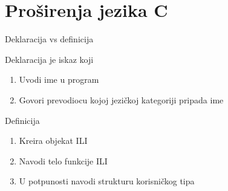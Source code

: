 \documentclass{article}
\newenvironment{xitemize}{%
    
    \itemize
    \larger
}{%
    \enditemize
}
\let\olditemize\itemize
\let\endolditemize\enditemize
\renewenvironment{itemize}{%
    \smaller
    \olditemize
}{%
    \endolditemize
}
\begin{document}
\section{Proširenja jezika C}
\begin{xitemize}

    \item Deklaracija vs definicija
    \begin{multicols}{2}
    \begin{itemize}
    
        \item Deklaracija je iskaz koji
        \begin{enumerate}
            \item Uvodi ime u program
            \item Govori prevodiocu kojoj jezičkoj kategoriji pripada ime
        \end{enumerate}
        \item Definicija
        \begin{enumerate}
            \item Kreira objekat ILI
            \item Navodi telo funkcije ILI
            \item U potpunosti navodi strukturu korisničkog tipa
        \end{enumerate}
        

\end{itemize}
\end{multicols}
\end{xitemize}
\end{document}

